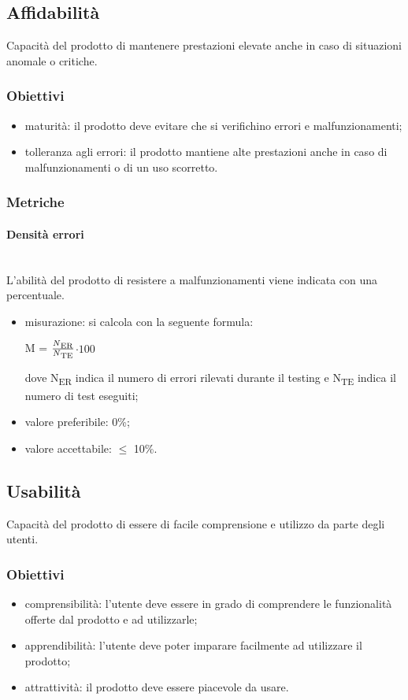 	\subsection{Affidabilità}
	Capacità del prodotto di mantenere prestazioni elevate anche in caso di situazioni anomale o critiche.
		\subsubsection{Obiettivi}
		\begin{itemize}
			\item maturità: il prodotto deve evitare che si verifichino errori e malfunzionamenti;
			\item tolleranza agli errori: il prodotto mantiene alte prestazioni anche in caso di malfunzionamenti o di un uso scorretto.
		\end{itemize}
		\subsubsection{Metriche}
			\paragraph{Densità errori}\mbox{}\\
			L'abilità del prodotto di resistere a malfunzionamenti viene indicata con una percentuale.
			\begin{itemize}
			\item misurazione: si calcola con la seguente formula: \\
			\centerline{ M =  \(\frac{N\textsubscript{ER}}{N\textsubscript{TE}} \)$ \cdot 100$ }
			dove N\textsubscript{ER} indica il numero di errori rilevati durante il testing e N\textsubscript{TE} indica il numero di test eseguiti;
			\item valore preferibile: 0\%;
			\item valore accettabile: $\leq$ 10\%.
			\end{itemize}
	\subsection{Usabilità}
	Capacità del prodotto di essere di facile comprensione e utilizzo da parte degli utenti.
		\subsubsection{Obiettivi}
		\begin{itemize}
			\item comprensibilità: l'utente deve essere in grado di comprendere le funzionalità offerte dal prodotto e ad utilizzarle;
			\item apprendibilità: l'utente deve poter imparare facilmente ad utilizzare il prodotto;
			\item attrattività: il prodotto deve essere piacevole da usare.
		\end{itemize}
